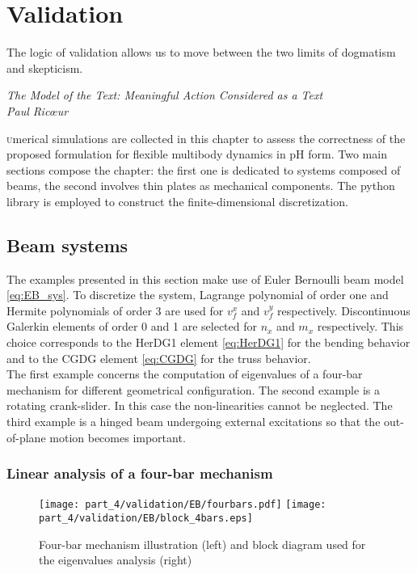 \chapter{Validation}\label{ch:valid}

\epigraph{The logic of validation allows us to move between the two limits of dogmatism and skepticism.}{\textit{The Model of the Text: Meaningful Action Considered as a Text\\
Paul Ric\oe{}ur}}

\minitoc

\lettrine{\color{theme}{N}}umerical simulations are collected in this chapter to assess the correctness of the proposed formulation for flexible multibody dynamics in pH form. Two main sections compose the chapter: the first one is dedicated to systems composed of beams, the second involves  thin plates as mechanical components. The {} python library \cite{rathgeber2017firedrake} is employed to construct the finite-dimensional discretization.

\section{Beam systems}
The examples presented in this section make use of Euler Bernoulli beam model \eqref{eq:EB_sys}. To discretize the system, Lagrange polynomial of order one and Hermite polynomials of order 3 are used for $v_f^x$ and $v_f^y$ respectively. Discontinuous Galerkin elements of order 0 and 1 are selected for $n_x$ and $m_{x}$ respectively. This choice corresponds to the HerDG1 element \eqref{eq:HerDG1} for the bending behavior and to the CGDG element \eqref{eq:CGDG} for the truss behavior.  \\
 
The first example concerns the computation of eigenvalues of a four-bar mechanism for different geometrical configuration. The second example is a rotating crank-slider. In this case the non-linearities cannot be neglected. The third example is a hinged beam undergoing external excitations so that the out-of-plane motion becomes important.   


\subsection{Linear analysis of a four-bar mechanism}

\begin{figure}[tb]
	\centering
	\texttt{[image: part\_4/validation/EB/fourbars.pdf]} 
	\hspace{.3cm}
	\texttt{[image: part\_4/validation/EB/block\_4bars.eps]} 
	\caption{Four-bar mechanism illustration (left) and block diagram used for the eigenvalues analysis (right)}
	\label{fig:4bars}
\end{figure}

